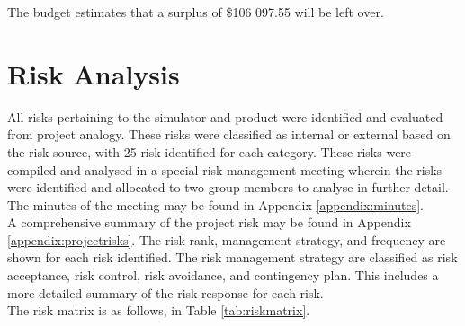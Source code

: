\noindent
The budget estimates that a surplus of \$106 097.55 will be left over. 

\newpage
\section{Risk Analysis}

All risks pertaining to the simulator and product were identified and evaluated from project analogy. These risks were classified as internal or external based on the risk source, with 25 risk identified for each category. These risks were compiled and analysed in a special risk management meeting wherein the risks were identified and allocated to two group members to analyse in further detail. The minutes of the meeting may be found in Appendix \ref{appendix:minutes}.\\

\noindent
A comprehensive summary of the project risk may be found in Appendix \ref{appendix:projectrisks}. The risk rank, management strategy, and frequency are shown for each risk identified. The risk management strategy are classified as risk acceptance, risk control, risk avoidance, and contingency plan. This includes a more detailed summary of the risk response for each risk.\\

\noindent
The risk matrix is as follows, in Table \ref{tab:riskmatrix}.

